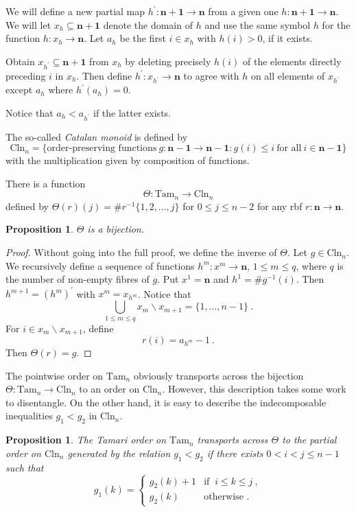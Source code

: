\documentclass[a4paper,12pt,reqno]{amsart}
\newtheorem{proposition}[theorem]{Proposition}
\theoremstyle{definition}
\theoremstyle{fact}
\theoremstyle{genquest}
\theoremstyle{step}
\newcommand{\lra}{\longrightarrow}
\def\ordn{{\mathbf{n}}}
\begin{document}
We will define a new partial map $h^{\prime} : \mathbf{n+1} \lra \mathbf{n}$ from a given one $h :\mathbf{n+1} \lra \mathbf{n}$.
We will let $x_h \subseteq \mathbf{n+1}$ denote the domain of $h$ and use the same symbol $h$ for the function $h: x_h \lra \ordn$. 
Let $a_h$ be the first $i \in x_h$ with $h(i) > 0$, if it exists.

Obtain $x_{h^{\prime}} \subseteq \mathbf{n+1}$ from $x_h$ 
by deleting precisely $h(i)$ 
of the elements directly preceding $i$ in $x_h$. 
Then define $h^{\prime} : x_{h^{\prime}} \lra \mathbf{n}$ to agree with $h$ on all elements of $x_{h^{\prime}}$
except $a_h$ where $h^{\prime}(a_h) = 0$.

Notice that $a_h < a_{h^{\prime}}$ if the latter exists.   

The so-called {\em Catalan monoid} is defined by 
$$\mathrm{Cln}_n = \{ \text{order-preserving functions} \ g : \mathbf{n-1} \rightarrow \mathbf{n-1} : g(i) \le i \ \text{for all} \ i\in \mathbf{n-1} \} $$
with the multiplication given by composition of functions.

There is a function $$\Theta : \mathrm{Tam}_n \lra \mathrm{Cln}_n $$
defined by $\Theta (r) (j) = \#r^{-1} \{1, 2, \dots , j\}$ for $0 \le j \le n-2$
for any rbf $r:\ordn \lra \ordn$.

\begin{proposition} $\Theta$ is a bijection.
\end{proposition}
\begin{proof}
Without going into the full proof, we define the inverse of $\Theta$.
Let $g\in \mathrm{Cln}_n$.
We recursively define a sequence of functions $h^m : x^m \lra \ordn$, $1 \le m \le q$, where $q$ is the number of non-empty fibres of $g$. 
Put $x^1 = \ordn$ and $h^1 = \# g^{-1}(i)$. 
Then $h^{m+1} = (h^m)^{\prime}$ with $x^{m} = x_{h^m}$.
Notice that $$\bigcup_{1\le m \le q} x_m \smallsetminus x_{m+1} = \{1, \dots , n-1\} \ . $$
For $i \in x_m \smallsetminus x_{m+1}$, define $$r(i) = a_{h^m}-1 \ .$$ 
Then $\Theta(r) = g$.
\end{proof}

The pointwise order on $\mathrm{Tam}_n$ obviously transports across the bijection $\Theta : \mathrm{Tam}_n \lra \mathrm{Cln}_n$ to an order on 
$\mathrm{Cln}_n$.
However, this description takes some work to disentangle. 
On the other hand, it is easy to describe the indecomposable
inequalities $g_1 < g_2$ in $\mathrm{Cln}_n$.  

\begin{proposition} The Tamari order on $\mathrm{Tam}_n$ transports across $\Theta$ to the partial order on 
$\mathrm{Cln}_n$ generated by the relation
$g_1 < g_2$ if there exists $0<i<j \le n-1$ such that 
\begin{equation*}
  g_1 (k) =
      \begin{cases}
         g_2 (k) + 1 & \text{if } \  i \le k \le j \ , \\
         g_2 (k) & \text{otherwise }.
       \end{cases}
\end{equation*}
\end{proposition}
\end{document}
